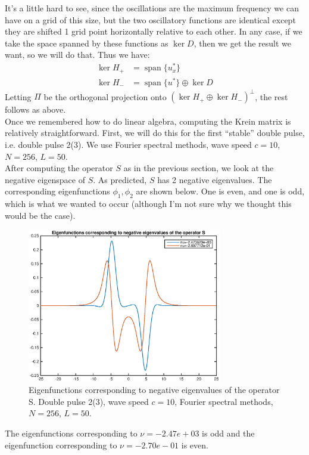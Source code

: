 \documentclass[12pt]{article}
\DeclareMathOperator{\spn}{span}
\begin{document}
It's a little hard to see, since the oscillations are the maximum frequency we can have on a grid of this size, but the two oscillatory functions are identical except they are shifted 1 grid point horizontally relative to each other. In any case, if we take the space spanned by these functions as $\ker D$, then we get the result we want, so we will do that. Thus we have:
\begin{align}
\ker H_+ &= \spn \{ u^*_x \} \\
\ker H_- &= \spn \{u^*\} \oplus \ker D
\end{align}
Letting $\Pi$ be the orthogonal projection onto $(\ker H_+ \oplus \ker H_-)^\perp$, the rest follows as above.\\

Once we remembered how to do linear algebra, computing the Krein matrix is relatively straightforward. First, we will do this for the first ``stable'' double pulse, i.e. double pulse 2(3). We use Fourier spectral methods, wave speed $c = 10$, $N = 256$, $L = 50$. \\

After computing the operator $S$ as in the previous section, we look at the negative eigenspace of $S$. As predicted, $S$ has 2 negative eigenvalues. The corresponding eigenfunctions $\phi_1, \phi_2$ are shown below. One is even, and one is odd, which is what we wanted to occur (although I'm not sure why we thought this would be the case).

\begin{figure}[H]
	\includegraphics[width=8.5cm]{dp2vNeg}
	\caption{Eigenfunctions corresponding to negative eigenvalues of the operator S. Double pulse 2(3), wave speed $c = 10$, Fourier spectral methods, $N = 256$, $L = 50$.}
\end{figure}

The eigenfunctions corresponding to $\nu = -2.47e+03$ is odd and the eigenfunction corresponding to $\nu=-2.70e-01$ is even.\\
\end{document}
